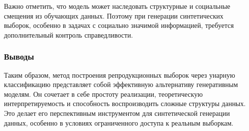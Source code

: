Важно отметить, что модель может наследовать структурные и социальные смещения из обучающих данных. Поэтому при генерации синтетических выборок, особенно в задачах с социально значимой информацией, требуется дополнительный контроль справедливости.

\subsubsection{Выводы}

Таким образом, метод построения репродукционных выборок через унарную классификацию представляет собой эффективную альтернативу генеративным моделям. Он сочетает в себе простоту реализации, теоретическую интерпретируемость и способность воспроизводить сложные структуры данных. Это делает его перспективным инструментом для синтетической генерации данных, особенно в условиях ограниченного доступа к реальным выборкам.
